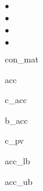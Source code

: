 \begin{list}{$\bullet$}
\begin{list}{$\bullet$}
\begin{list}{$\bullet$}
\begin{list}{$\bullet$}
            \item con\_mat
            \item acc
            \item c\_acc
            \item b\_acc
            \item c\_pv
            \item acc\_lb
            \item acc\_ub
            \end{list}
        \end{list}
    \end{list}
\end{list}
